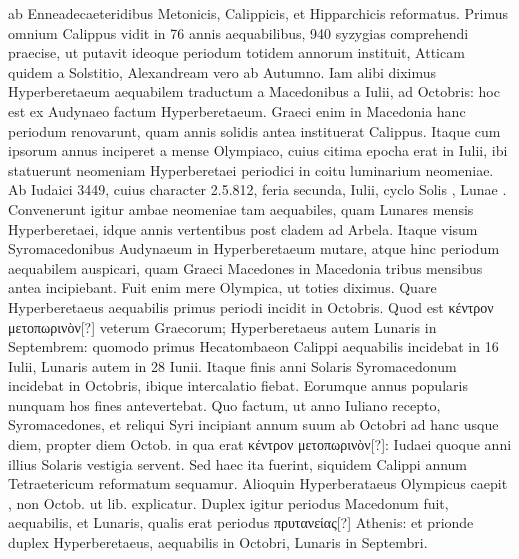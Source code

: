 ab Enneadecaeteridibus Metonicis, Calippicis, et Hipparchicis reformatus.
Primus omnium Calippus vidit in 76 annis aequabilibus, 940
syzygias comprehendi praecise, ut putavit ideoque periodum totidem annorum
instituit, Atticam quidem a Solstitio, Alexandream vero ab Autumno.
Iam alibi diximus Hyperberetaeum aequabilem traductum a
Macedonibus a  Iulii, ad  Octobris:
 hoc est ex Audynaeo factum
Hyperberetaeum.
Graeci enim in Macedonia hanc periodum renovarunt,
quam annis  solidis antea instituerat Calippus.
Itaque
cum ipsorum annus inciperet a mense Olympiaco, cuius citima epocha
erat in  Iulii, ibi statuerunt neomeniam Hyperberetaei periodici
in coitu luminarium neomeniae.
Ab Iudaici 3449, cuius character 2.5.812,
feria secunda,  Iulii, cyclo Solis , Lunae .
Convenerunt
igitur ambae neomeniae tam aequabiles, quam Lunares mensis Hyperberetaei,
idque  annis vertentibus post cladem ad Arbela.
Itaque
visum Syromacedonibus Audynaeum in Hyperberetaeum mutare, atque
hinc periodum aequabilem auspicari, quam Graeci Macedones in Macedonia
tribus mensibus antea incipiebant.
%
Fuit enim mere Olympica,
ut toties diximus.
Quare Hyperberetaeus aequabilis primus periodi incidit
in  Octobris.
Quod est \textgreek{κέντρον μετοπωρινὸν[?]} veterum Graecorum;
Hyperberetaeus autem Lunaris in Septembrem: quomodo primus
Hecatombaeon Calippi aequabilis incidebat in 16 Iulii, Lunaris autem
in 28 Iunii.
Itaque finis anni Solaris Syromacedonum incidebat in 
Octobris, ibique intercalatio fiebat.
Eorumque annus popularis nunquam
hos fines antevertebat.
Quo factum, ut anno Iuliano recepto,
Syromacedones, et reliqui Syri incipiant annum suum ab Octobri ad
hanc usque diem, propter diem  Octob. %
 in qua erat \textgreek{κέντρον μετοπωρινὸν[?]}:
Iudaei quoque anni illius Solaris vestigia servent.
Sed haec ita fuerint,
siquidem Calippi annum Tetraetericum reformatum sequamur.
Alioquin
Hyperberataeus Olympicus caepit , non  Octob. %
 ut lib. %
explicatur.
Duplex igitur periodus Macedonum fuit, aequabilis, et
Lunaris, qualis erat periodus \textgreek{πρυτανείας[?]} Athenis:
 et prionde duplex
Hyperberetaeus, aequabilis in Octobri, Lunaris in Septembri.
